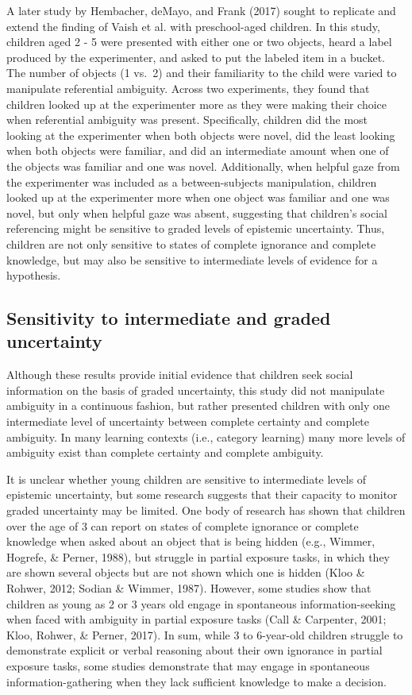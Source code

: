 \documentclass[man]{apa6}
\theoremstyle{definition}
\theoremstyle{definition}
\theoremstyle{definition}
\theoremstyle{remark}
\begin{document}
A later study by Hembacher, deMayo, and Frank (2017) sought to replicate
and extend the finding of Vaish et al. with preschool-aged children. In
this study, children aged 2 - 5 were presented with either one or two
objects, heard a label produced by the experimenter, and asked to put
the labeled item in a bucket. The number of objects (1 vs.~2) and their
familiarity to the child were varied to manipulate referential
ambiguity. Across two experiments, they found that children looked up at
the experimenter more as they were making their choice when referential
ambiguity was present. Specifically, children did the most looking at
the experimenter when both objects were novel, did the least looking
when both objects were familiar, and did an intermediate amount when one
of the objects was familiar and one was novel. Additionally, when
helpful gaze from the experimenter was included as a between-subjects
manipulation, children looked up at the experimenter more when one
object was familiar and one was novel, but only when helpful gaze was
absent, suggesting that children's social referencing might be sensitive
to graded levels of epistemic uncertainty. Thus, children are not only
sensitive to states of complete ignorance and complete knowledge, but
may also be sensitive to intermediate levels of evidence for a
hypothesis.

\subsection{Sensitivity to intermediate and graded
uncertainty}\label{sensitivity-to-intermediate-and-graded-uncertainty}

Although these results provide initial evidence that children seek
social information on the basis of graded uncertainty, this study did
not manipulate ambiguity in a continuous fashion, but rather presented
children with only one intermediate level of uncertainty between
complete certainty and complete ambiguity. In many learning contexts
(i.e., category learning) many more levels of ambiguity exist than
complete certainty and complete ambiguity.

It is unclear whether young children are sensitive to intermediate
levels of epistemic uncertainty, but some research suggests that their
capacity to monitor graded uncertainty may be limited. One body of
research has shown that children over the age of 3 can report on states
of complete ignorance or complete knowledge when asked about an object
that is being hidden (e.g., Wimmer, Hogrefe, \& Perner, 1988), but
struggle in partial exposure tasks, in which they are shown several
objects but are not shown which one is hidden (Kloo \& Rohwer, 2012;
Sodian \& Wimmer, 1987). However, some studies show that children as
young as 2 or 3 years old engage in spontaneous information-seeking when
faced with ambiguity in partial exposure tasks (Call \& Carpenter, 2001;
Kloo, Rohwer, \& Perner, 2017). In sum, while 3 to 6-year-old children
struggle to demonstrate explicit or verbal reasoning about their own
ignorance in partial exposure tasks, some studies demonstrate that may
engage in spontaneous information-gathering when they lack sufficient
knowledge to make a decision.
\end{document}
